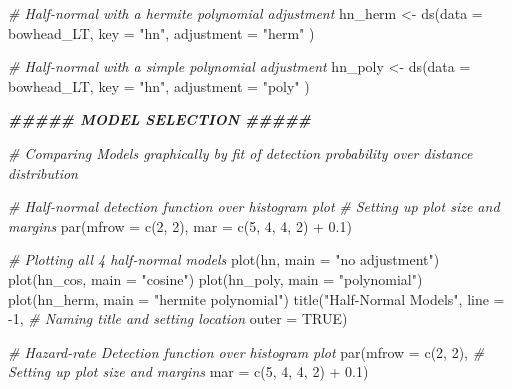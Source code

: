 \documentclass[
  12pt,
]{article}
\newenvironment{Shaded}{\begin{snugshade}}{\end{snugshade}}
\newcommand{\AttributeTok}[1]{\textcolor[rgb]{0.77,0.63,0.00}{#1}}
\newcommand{\CommentTok}[1]{\textcolor[rgb]{0.56,0.35,0.01}{\textit{#1}}}
\newcommand{\ConstantTok}[1]{\textcolor[rgb]{0.00,0.00,0.00}{#1}}
\newcommand{\DecValTok}[1]{\textcolor[rgb]{0.00,0.00,0.81}{#1}}
\newcommand{\DocumentationTok}[1]{\textcolor[rgb]{0.56,0.35,0.01}{\textbf{\textit{#1}}}}
\newcommand{\FloatTok}[1]{\textcolor[rgb]{0.00,0.00,0.81}{#1}}
\newcommand{\FunctionTok}[1]{\textcolor[rgb]{0.00,0.00,0.00}{#1}}
\newcommand{\NormalTok}[1]{#1}
\newcommand{\OtherTok}[1]{\textcolor[rgb]{0.56,0.35,0.01}{#1}}
\newcommand{\SpecialCharTok}[1]{\textcolor[rgb]{0.00,0.00,0.00}{#1}}
\newcommand{\StringTok}[1]{\textcolor[rgb]{0.31,0.60,0.02}{#1}}
\begin{document}
\begin{Shaded}
\begin{Highlighting}[]
\CommentTok{\# Half{-}normal with a hermite polynomial adjustment}
\NormalTok{hn\_herm }\OtherTok{\textless{}{-}} \FunctionTok{ds}\NormalTok{(}\AttributeTok{data =}\NormalTok{ bowhead\_LT, }
              \AttributeTok{key =} \StringTok{"hn"}\NormalTok{, }
              \AttributeTok{adjustment =} \StringTok{"herm"}\NormalTok{ )}

\CommentTok{\# Half{-}normal with a simple polynomial adjustment}
\NormalTok{hn\_poly }\OtherTok{\textless{}{-}} \FunctionTok{ds}\NormalTok{(}\AttributeTok{data =}\NormalTok{ bowhead\_LT, }
              \AttributeTok{key =} \StringTok{"hn"}\NormalTok{, }
              \AttributeTok{adjustment =} \StringTok{"poly"}\NormalTok{ )}
\end{Highlighting}
\end{Shaded}

\begin{Shaded}
\begin{Highlighting}[]
\DocumentationTok{\#\#\#\#\#     MODEL SELECTION     \#\#\#\#\#}

\CommentTok{\# Comparing Models graphically by fit of detection probability over distance distribution}

\CommentTok{\# Half{-}normal detection function over histogram plot}
\CommentTok{\# Setting up plot size and margins}
\FunctionTok{par}\NormalTok{(}\AttributeTok{mfrow =} \FunctionTok{c}\NormalTok{(}\DecValTok{2}\NormalTok{, }\DecValTok{2}\NormalTok{), }
    \AttributeTok{mar =} \FunctionTok{c}\NormalTok{(}\DecValTok{5}\NormalTok{, }\DecValTok{4}\NormalTok{, }\DecValTok{4}\NormalTok{, }\DecValTok{2}\NormalTok{) }\SpecialCharTok{+} \FloatTok{0.1}\NormalTok{) }

\CommentTok{\# Plotting all 4 half{-}normal models}
\FunctionTok{plot}\NormalTok{(hn, }\AttributeTok{main =} \StringTok{"no adjustment"}\NormalTok{) }
\FunctionTok{plot}\NormalTok{(hn\_cos, }\AttributeTok{main =} \StringTok{"cosine"}\NormalTok{)}
\FunctionTok{plot}\NormalTok{(hn\_poly, }\AttributeTok{main =} \StringTok{"polynomial"}\NormalTok{)}
\FunctionTok{plot}\NormalTok{(hn\_herm, }\AttributeTok{main =} \StringTok{"hermite polynomial"}\NormalTok{)}
\FunctionTok{title}\NormalTok{(}\StringTok{"Half{-}Normal Models"}\NormalTok{, }
      \AttributeTok{line =} \SpecialCharTok{{-}}\DecValTok{1}\NormalTok{, }
      \CommentTok{\# Naming title and setting location}
      \AttributeTok{outer =} \ConstantTok{TRUE}\NormalTok{) }


\CommentTok{\# Hazard{-}rate Detection function over histogram plot}
\FunctionTok{par}\NormalTok{(}\AttributeTok{mfrow =} \FunctionTok{c}\NormalTok{(}\DecValTok{2}\NormalTok{, }\DecValTok{2}\NormalTok{), }
    \CommentTok{\# Setting up plot size and margins}
    \AttributeTok{mar =} \FunctionTok{c}\NormalTok{(}\DecValTok{5}\NormalTok{, }\DecValTok{4}\NormalTok{, }\DecValTok{4}\NormalTok{, }\DecValTok{2}\NormalTok{) }\SpecialCharTok{+} \FloatTok{0.1}\NormalTok{) }


\end{Highlighting}
\end{Shaded}
\end{document}
